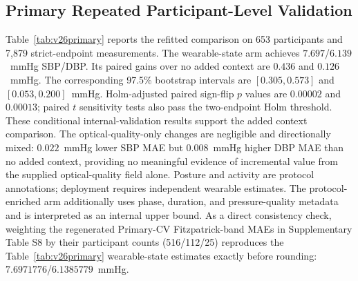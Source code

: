 \documentclass[12pt]{article}
\begin{document}
\subsection{Primary Repeated Participant-Level Validation}
\label{sec:v26primary}
Table~\ref{tab:v26primary} reports the refitted comparison on 653 participants and 7,879 strict-endpoint measurements. The wearable-state arm achieves $7.697$/$6.139$~mmHg SBP/DBP. Its paired gains over no added context are $0.436$ and $0.126$~mmHg. The corresponding 97.5\% bootstrap intervals are $[0.305, 0.573]$ and $[0.053, 0.200]$~mmHg. Holm-adjusted paired sign-flip $p$ values are $0.00002$ and $0.00013$; paired $t$ sensitivity tests also pass the two-endpoint Holm threshold. These conditional internal-validation results support the added context comparison. The optical-quality-only changes are negligible and directionally mixed: $0.022$~mmHg lower SBP MAE but $0.008$~mmHg higher DBP MAE than no added context, providing no meaningful evidence of incremental value from the supplied optical-quality field alone. Posture and activity are protocol annotations; deployment requires independent wearable estimates. The protocol-enriched arm additionally uses phase, duration, and pressure-quality metadata and is interpreted as an internal upper bound. As a direct consistency check, weighting the regenerated Primary-CV Fitzpatrick-band MAEs in Supplementary Table S8 by their participant counts (516/112/25) reproduces the Table~\ref{tab:v26primary} wearable-state estimates exactly before rounding: $7.6971776$/$6.1385779$~mmHg.
\begin{table}[t]
\centering
\caption{Refitted Repeated Participant-Level Validation (653 Participants; Three-Reading Anchor)}
\label{tab:v26primary}
\scriptsize
{}
\end{table}
\end{document}
